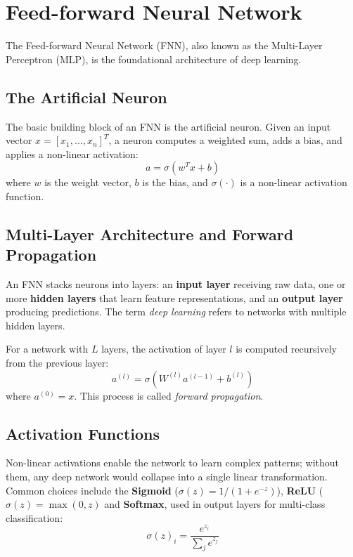 \section{Feed-forward Neural Network}

The Feed-forward Neural Network (FNN), also known as the Multi-Layer Perceptron (MLP), is the foundational architecture of deep learning.

\subsection{The Artificial Neuron}
The basic building block of an FNN is the artificial neuron. Given an input vector $x = [x_1, ..., x_n]^T$, a neuron computes a weighted sum, adds a bias, and applies a non-linear activation:
\begin{equation}
    a = \sigma(w^T x + b)
\end{equation}
where $w$ is the weight vector, $b$ is the bias, and $\sigma(\cdot)$ is a non-linear activation function.

\subsection{Multi-Layer Architecture and Forward Propagation}
An FNN stacks neurons into layers: an \textbf{input layer} receiving raw data, one or more \textbf{hidden layers} that learn feature representations, and an \textbf{output layer} producing predictions. The term \textit{deep learning} refers to networks with multiple hidden layers.

For a network with $L$ layers, the activation of layer $l$ is computed recursively from the previous layer:
\begin{equation}
    a^{(l)} = \sigma(W^{(l)} a^{(l-1)} + b^{(l)})
\end{equation}
where $a^{(0)} = x$. This process is called \textit{forward propagation}.

\subsection{Activation Functions}
Non-linear activations enable the network to learn complex patterns; without them, any deep network would collapse into a single linear transformation. Common choices include the \textbf{Sigmoid} ($\sigma(z) = 1/(1 + e^{-z})$), \textbf{ReLU} ($\sigma(z) = \max(0, z)$ and \textbf{Softmax}, used in output layers for multi-class classification:
\begin{equation}
    \sigma(z)_i = \frac{e^{z_i}}{\sum_{j} e^{z_j}}
\end{equation}

